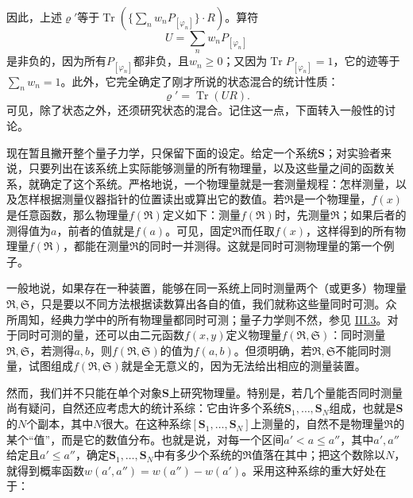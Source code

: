 \documentclass[fontsize=13pt,twoside,openany,headings=normal,parskip=false,bookmarkpackage=false,DIV=calc]{scrbook}
\begin{document}
\hypertarget{origpage-158}{}\label{origpage-158}因此，上述$\varrho'$等于$\operatorname{Tr}(\{\sum_nw_nP_{[\varphi_n]}\}\cdot R)$。算符
\[
U=\sum_nw_nP_{[\varphi_n]}
\]
是非负的，因为所有$P_{[\varphi_n]}$都非负，且$w_n\geq0$；又因为$\operatorname{Tr}P_{[\varphi_n]}=1$，它的迹等于$\sum_nw_n=1$。此外，它完全确定了刚才所说的状态混合的统计性质：
\[
\varrho'=\operatorname{Tr}(UR).
\]
可见，除了状态之外，还须研究状态的混合。记住这一点，下面转入一般性的讨论。

现在暂且撇开整个量子力学，只保留下面的设定。给定一个系统$\boldsymbol{S}$；对实验者来说，只要列出在该系统上实际能够测量的所有物理量，以及这些量之间的函数关系，就确定了这个系统。严格地说，一个物理量就是一套测量规程：怎样测量，以及怎样根据测量仪器指针的位置读出或算出它的数值。若$\mathfrak R$是一个物理量，$f(x)$是任意函数，那么物理量$f(\mathfrak R)$定义如下：测量$f(\mathfrak R)$时，先测量$\mathfrak R$；如果后者的测得值为$a$，前者的值就是$f(a)$。可见，固定$\mathfrak R$而任取$f(x)$，这样得到的所有物理量$f(\mathfrak R)$，都能在测量$\mathfrak R$的同时一并测得。这就是同时可测物理量的第一个例子。

一般地说，如果存在一种装置，能够在同一系统上同时测量两个（或更多）物理量$\mathfrak R,\allowbreak \mathfrak S$，只是要以不同方法根据读数算出各自的值，我们就称这些量同时可测。众所周知，经典力学中的所有物理量都同时可测；量子力学则不然，参见 \hyperref[sec:III.3]{III.3}。对于同时可测的量，还可以由二元函数$f(x,\allowbreak y)$定义物理量$f(\mathfrak R,\allowbreak \mathfrak S)$：同时测量$\mathfrak R,\allowbreak \mathfrak S$，若测得$a,\allowbreak b$，则$f(\mathfrak R,\allowbreak \mathfrak S)$的值为$f(a,\allowbreak b)$。但须明确，若$\mathfrak R,\allowbreak \mathfrak S$不能同时测量，试图组成$f(\mathfrak R,\allowbreak \mathfrak S)$就是全无意义的，因为无法给出相应的测量装置。

然而，我们并不只能在单个对象$\boldsymbol{S}$上研究物理量。特别是，若几个量能否同时测量尚有疑问，自然还应考虑大的统计系综：它由许多个系统$\boldsymbol{S}_1,\allowbreak \ldots,\allowbreak \boldsymbol{S}_N$组成，也就是$\boldsymbol{S}$的$N$个副本，其中$N$很大。在这种系综$[\boldsymbol{S}_1,\allowbreak \ldots,\allowbreak \boldsymbol{S}_N]$上测量的，自然不是物理量$\mathfrak R$的某个“值”，而是它的数值分布。也就是说，对每一个区间$a'<a\leq a''$，\hypertarget{origpage-159}{}\label{origpage-159}其中$a',\allowbreak a''$给定且$a'\leq a''$，确定$\boldsymbol{S}_1,\allowbreak \ldots,\allowbreak \boldsymbol{S}_N$中有多少个系统的$\mathfrak R$值落在其中；把这个数除以$N$，就得到概率函数$w(a',\allowbreak a'')=w(a'')-w(a')$。采用这种系综的重大好处在于：
\end{document}
